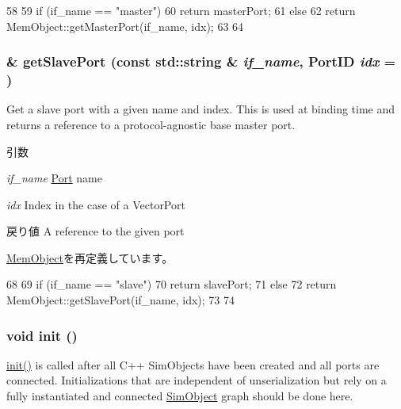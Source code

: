 \begin{DoxyCode}
58 {
59     if (if_name == "master") {
60         return masterPort;
61     } else {
62         return MemObject::getMasterPort(if_name, idx);
63     }
64 }
\end{DoxyCode}
\hypertarget{classAddrMapper_ac918a145092d7514ebc6dbd952dceafb}{
\subsubsection[{getSlavePort}]{ \& getSlavePort (const std::string \& {\em if\_\-name}, \/  {\bf PortID} {\em idx} = {})}}
\label{classAddrMapper_ac918a145092d7514ebc6dbd952dceafb}
Get a slave port with a given name and index. This is used at binding time and returns a reference to a protocol-\/agnostic base master port.


\begin{DoxyParams}{引数}
\item[{\em if\_\-name}]\hyperlink{classPort}{Port} name \item[{\em idx}]Index in the case of a VectorPort\end{DoxyParams}
\begin{DoxyReturn}{戻り値}
A reference to the given port 
\end{DoxyReturn}


\hyperlink{classMemObject_ac918a145092d7514ebc6dbd952dceafb}{MemObject}を再定義しています。


\begin{DoxyCode}
68 {
69     if (if_name == "slave") {
70         return slavePort;
71     } else {
72         return MemObject::getSlavePort(if_name, idx);
73     }
74 }
\end{DoxyCode}
\hypertarget{classAddrMapper_a02fd73d861ef2e4aabb38c0c9ff82947}{
\subsubsection[{init}]{\setlength{\rightskip}{0pt plus 5cm}void init ()}}
\label{classAddrMapper_a02fd73d861ef2e4aabb38c0c9ff82947}
\hyperlink{classAddrMapper_a02fd73d861ef2e4aabb38c0c9ff82947}{init()} is called after all C++ SimObjects have been created and all ports are connected. Initializations that are independent of unserialization but rely on a fully instantiated and connected \hyperlink{classSimObject}{SimObject} graph should be done here. 

